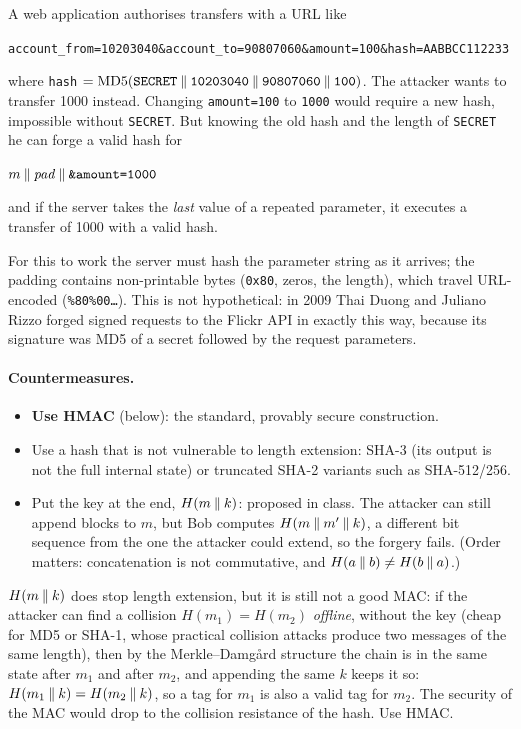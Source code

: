 \begin{example}
A web application authorises transfers with a URL like
\begin{center}
\small\texttt{account\_from=10203040\&account\_to=90807060\&amount=100\&hash=AABBCC112233}
\end{center}
where \texttt{hash} $= \mathrm{MD5}(\texttt{SECRET} \mathbin{\|} \texttt{10203040} \mathbin{\|} \texttt{90807060} \mathbin{\|} \texttt{100})$. The attacker wants to transfer 1000 instead. Changing \texttt{amount=100} to \texttt{1000} would require a new hash, impossible without \texttt{SECRET}. But knowing the old hash and the length of \texttt{SECRET} he can forge a valid hash for
\begin{center}
\small $m \mathbin{\|} \mathit{pad} \mathbin{\|} \texttt{\&amount=1000}$
\end{center}
and if the server takes the \emph{last} value of a repeated parameter, it executes a transfer of 1000 with a valid hash.

For this to work the server must hash the parameter string as it arrives; the padding contains non-printable bytes (\texttt{0x80}, zeros, the length), which travel URL-encoded (\texttt{\%80\%00\dots}). This is not hypothetical: in 2009 Thai Duong and Juliano Rizzo forged signed requests to the Flickr API in exactly this way, because its signature was MD5 of a secret followed by the request parameters.
\end{example}

\paragraph{Countermeasures.}
\begin{itemize}
    \item \textbf{Use HMAC} (below): the standard, provably secure construction.
    \item Use a hash that is not vulnerable to length extension: SHA-3 (its output is not the full internal state) or truncated SHA-2 variants such as SHA-512/256.
    \item Put the key at the end, $H(m \mathbin{\|} k)$: proposed in class. The attacker can still append blocks to $m$, but Bob computes $H(m \mathbin{\|} m' \mathbin{\|} k)$, a different bit sequence from the one the attacker could extend, so the forgery fails. (Order matters: concatenation is not commutative, and $H(a \mathbin{\|} b) \neq H(b \mathbin{\|} a)$.)
\end{itemize}

\begin{remark}
$H(m \mathbin{\|} k)$ does stop length extension, but it is still not a good MAC: if the attacker can find a collision $H(m_1) = H(m_2)$ \emph{offline}, without the key (cheap for MD5 or SHA-1, whose practical collision attacks produce two messages of the same length), then by the Merkle--Damgård structure the chain is in the same state after $m_1$ and after $m_2$, and appending the same $k$ keeps it so: $H(m_1 \mathbin{\|} k) = H(m_2 \mathbin{\|} k)$, so a tag for $m_1$ is also a valid tag for $m_2$. The security of the MAC would drop to the collision resistance of the hash. Use HMAC.
\end{remark}

